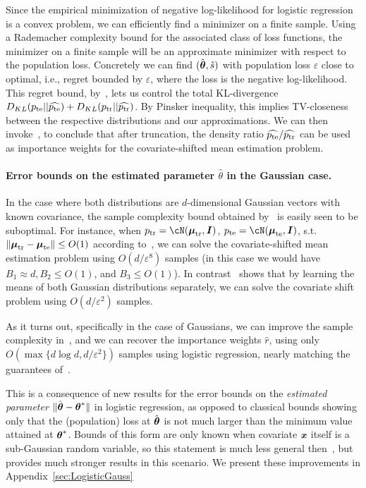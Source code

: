 Since the empirical minimization of negative log-likelihood for logistic regression is a convex problem, we can efficiently find a minimizer on a finite sample. Using a Rademacher complexity bound for the associated class of loss functions, the minimizer on a finite sample will be an approximate minimizer with respect to the population loss. Concretely we can find $(\hat{\boldsymbol{\mathit{\theta}}}, \hat{s})$ with population loss $\varepsilon$ close to optimal, i.e., regret bounded by $\varepsilon$, where the loss is the negative log-likelihood. This regret bound, by~, lets us control the total KL-divergence $D_{KL}(p_{\mathrm{te}} || \widehat{p_{\mathrm{te}}}) + D_{KL}(p_{\mathrm{tr}} || \widehat{p_{\mathrm{tr}}})$. By Pinsker inequality, this implies TV-closeness between the respective distributions and our approximations. We can then invoke~, to conclude that after truncation, the density ratio $\widehat{p_{\mathrm{te}}}/\widehat{p_{\mathrm{tr}}}$ can be used as importance weights for the covariate-shifted mean estimation problem.

\paragraph{Error bounds on the estimated parameter $\hat{\theta}$ in the Gaussian case.}

In the case where both distributions are $d$-dimensional Gaussian vectors with known covariance, the sample complexity bound obtained by~ is easily seen to be suboptimal. For instance, when $\ptr = \cN(\mtr, \II)$, $\pte = \cN(\mte, \II)$, s.t. $\|\boldsymbol{\mathit{\mu}}_{\mathrm{tr}} - \boldsymbol{\mathit{\mu}}_{\mathrm{te}}\| \leq O(1)$ according to~, we can solve the covariate-shifted mean estimation problem using $O(d/\varepsilon^8)$ samples (in this case we would have $B_1 \approx d, B_2 \leq O(1)$, and $B_3 \leq O(1)$). In contrast~ shows that by learning the means of both Gaussian distributions separately, we can solve the covariate shift problem using $O(d/\varepsilon^{2})$ samples.

  
As it turns out, specifically in the case of Gaussians, we can improve the sample complexity in~, and we can recover the importance weights $\hat{r}$, using only $O(\max\{d \log d, d/\varepsilon^{2}\})$ samples using logistic regression, nearly matching the guarantees of~.

This is a consequence of new results for the error bounds on the \emph{estimated parameter} $\|\hat{\boldsymbol{\mathit{\theta}}} - \boldsymbol{\mathit{\theta}}^*\|$ in logistic regression, as opposed to classical bounds showing only that the (population) loss at $\hat{\boldsymbol{\mathit{\theta}}}$ is not much larger than the minimum value attained at $\boldsymbol{\mathit{\theta}}^*$. Bounds of this form are only known when covariate $\boldsymbol{\mathit{x}}$ itself is a sub-Gaussian random variable, so this statement is much less general then~, but provides much stronger results in this scenario.  We present these improvements in Appendix~\ref{sec:LogisticGauss}

